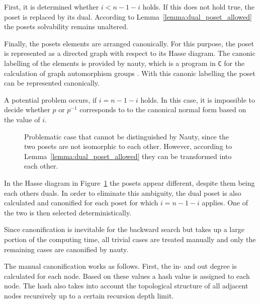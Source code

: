 \documentclass[10pt,journal,compsoc]{IEEEtran}
\begin{document}
First, it is determined whether $i < n - 1 - i$ holds.
If this does not hold true, the poset is replaced by its dual.
According to Lemma~\ref{lemma:dual_poset_allowed} the posets solvability remains unaltered.

Finally, the posets elements are arranged canonically.
For this purpose, the poset is represented as a directed graph with respect to its Hasse diagram.
The canonic labelling of the elements is provided by nauty, which is a program in \texttt{C} for the calculation of graph automorphism groups \cite[Practical Graph Isomorphism]{MCKAY201494}.
With this canonic labelling the poset can be represented canonically.

A potential problem occurs, if $i = n - 1 - i$ holds.
In this case, it is impossible to decide whether $p$ or $p^{-1}$ corresponds to to the canonical normal form based on the value of $i$.

\begin{figure}[!b]
  \centering
  
  \caption{Problematic case that cannot be distinguished by Nauty, since the two posets are not isomorphic to each other. However, according to Lemma~\ref{lemma:dual_poset_allowed} they can be transformed into each other.}
  \label{fig:backward_canonify_problematic}
\end{figure}

In the Hasse diagram in Figure~\ref{fig:backward_canonify_problematic} the posets appear different, despite them being each others duals.
In order to eliminate this ambiguity, the dual poset is also calculated and canonified for each poset for which $i = n - 1 - i$ applies.
One of the two is then selected deterministically.

Since canonification is inevitable for the backward search but takes up a large portion of the computing time, all trivial cases are treated manually and only the remaining cases are canonified by nauty.

The manual canonification works as follows.
First, the in- and out degree is calculated for each node.
Based on these values a hash value is assigned to each node.
The hash also takes into account the topological structure of all adjacent nodes recursively up to a certain recursion depth limit.
\end{document}
